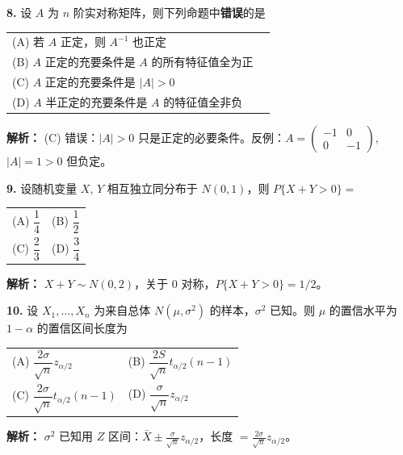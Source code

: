 \textbf{8.} 设 $A$ 为 $n$ 阶实对称矩阵，则下列命题中\textbf{错误}的是
\begin{center}
\begin{tabular}{ll}
(A) 若 $A$ 正定，则 $A^{-1}$ 也正定 \\[4pt]
(B) $A$ 正定的充要条件是 $A$ 的所有特征值全为正 \\[4pt]
(C) $A$ 正定的充要条件是 $|A|>0$ \\[4pt]
(D) $A$ 半正定的充要条件是 $A$ 的特征值全非负
\end{tabular}
\end{center}

\ifshowsolutions\par\noindent\textbf{解析：} (C) 错误：$|A|>0$ 只是正定的必要条件。反例：$A=\begin{pmatrix}-1&0\\0&-1\end{pmatrix}$, $|A|=1>0$ 但负定。\else \answerarea \fi

\vspace{8pt}

\textbf{9.} 设随机变量 $X$, $Y$ 相互独立同分布于 $N(0,1)$，则 $P\{X+Y>0\}=$
\begin{center}
\begin{tabular}{ll}
(A) $\dfrac{1}{4}$ & (B) $\dfrac{1}{2}$ \\[6pt]
(C) $\dfrac{2}{3}$ & (D) $\dfrac{3}{4}$
\end{tabular}
\end{center}

\ifshowsolutions\par\noindent\textbf{解析：} $X+Y\sim N(0,2)$，关于 $0$ 对称，$P\{X+Y>0\}=1/2$。\else \answerarea \fi

\vspace{8pt}

\textbf{10.} 设 $X_1,\ldots,X_n$ 为来自总体 $N(\mu,\sigma^2)$ 的样本，$\sigma^2$ 已知。则 $\mu$ 的置信水平为 $1-\alpha$ 的置信区间长度为
\begin{center}
\begin{tabular}{ll}
(A) $\dfrac{2\sigma}{\sqrt{n}} z_{\alpha/2}$ & (B) $\dfrac{2S}{\sqrt{n}} t_{\alpha/2}(n-1)$ \\[6pt]
(C) $\dfrac{2\sigma}{\sqrt{n}} t_{\alpha/2}(n-1)$ & (D) $\dfrac{\sigma}{\sqrt{n}} z_{\alpha/2}$
\end{tabular}
\end{center}

\ifshowsolutions\par\noindent\textbf{解析：} $\sigma^2$ 已知用 $Z$ 区间：$\bar{X}\pm\frac{\sigma}{\sqrt{n}}z_{\alpha/2}$，长度 $=\frac{2\sigma}{\sqrt{n}}z_{\alpha/2}$。\else \answerarea \fi

